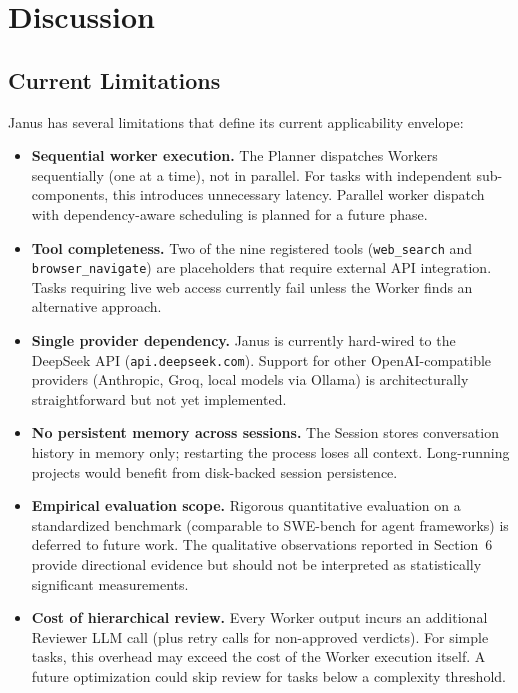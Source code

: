 \documentclass[11pt,a4paper]{article}
\begin{document}
\section{Discussion}

\subsection{Current Limitations}

Janus has several limitations that define its current applicability envelope:

\begin{itemize}[leftmargin=*,itemsep=2pt]
    \item \textbf{Sequential worker execution.} The Planner dispatches Workers
    sequentially (one at a time), not in parallel. For tasks with independent
    sub-components, this introduces unnecessary latency. Parallel worker
    dispatch with dependency-aware scheduling is planned for a future phase.

    \item \textbf{Tool completeness.} Two of the nine registered tools
    (\texttt{web\_search} and \texttt{browser\_navigate}) are placeholders
    that require external API integration. Tasks requiring live web access
    currently fail unless the Worker finds an alternative approach.

    \item \textbf{Single provider dependency.} Janus is currently hard-wired
    to the DeepSeek API (\texttt{api.deepseek.com}). Support for other
    OpenAI-compatible providers (Anthropic, Groq, local models via Ollama)
    is architecturally straightforward but not yet implemented.

    \item \textbf{No persistent memory across sessions.} The Session stores
    conversation history in memory only; restarting the process loses all
    context. Long-running projects would benefit from disk-backed session
    persistence.

    \item \textbf{Empirical evaluation scope.} Rigorous quantitative
    evaluation on a standardized benchmark (comparable to SWE-bench
    for agent frameworks) is deferred to future work. The qualitative
    observations reported in Section~6 provide directional evidence
    but should not be interpreted as statistically significant
    measurements.

    \item \textbf{Cost of hierarchical review.} Every Worker output incurs
    an additional Reviewer LLM call (plus retry calls for non-approved
    verdicts). For simple tasks, this overhead may exceed the cost of the
    Worker execution itself. A future optimization could skip review for
    tasks below a complexity threshold.
\end{itemize}
\end{document}
